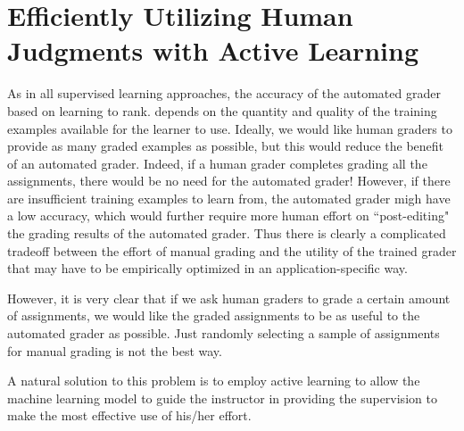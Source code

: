 \section{Efficiently Utilizing Human Judgments with Active Learning}
As in all supervised learning approaches, 
the accuracy of  the automated grader based on learning to rank. depends
on the quantity and quality of the training examples available for the 
learner to use. Ideally, we would like human graders to provide
 as many graded examples as possible, but this would
reduce the benefit of an automated grader. Indeed,
if a human grader completes grading all the assignments,
there would be no need for the automated grader!
However, if there are insufficient training examples 
to learn from, the automated grader migh have a low accuracy,
which would further require more human effort on 
``post-editing" the grading results of the automated grader. 
Thus there is clearly a complicated tradeoff between
the effort of manual grading and the utility of the trained
 grader that may have to be empirically optimized in an application-specific way.

However, it is very clear that if we ask human graders to grade
a certain amount of assignments, we would like the
graded assignments to be as useful to the automated grader as possible.
Just randomly selecting a sample of assignments for manual grading
is not the best way. 
A natural solution to this problem is to employ 
active learning to allow the machine learning model to
guide the instructor in providing the supervision to make the most
effective use of his/her effort.

